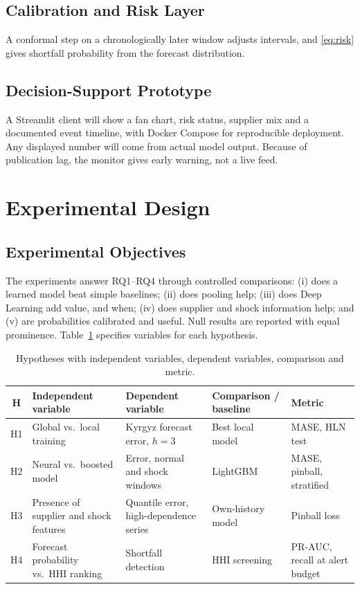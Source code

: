 \documentclass[conference]{IEEEtran}
\begin{document}
\subsection{Calibration and Risk Layer}
A conformal step on a chronologically later window adjusts intervals, and \eqref{eq:risk} gives shortfall probability from the forecast distribution.

\subsection{Decision-Support Prototype}
A Streamlit client will show a fan chart, risk status, supplier mix and a documented event timeline, with Docker Compose for reproducible deployment. Any displayed number will come from actual model output. Because of publication lag, the monitor gives early warning, not a live feed.

\section{Experimental Design}\label{sec:exp}

\subsection{Experimental Objectives}
The experiments answer RQ1--RQ4 through controlled comparisons: (i) does a learned model beat simple baselines; (ii) does pooling help; (iii) does Deep Learning add value, and when; (iv) does supplier and shock information help; and (v) are probabilities calibrated and useful. Null results are reported with equal prominence. Table~\ref{tab:hyp} specifies variables for each hypothesis.

\begin{table}[t]
\centering
\caption{Hypotheses with independent variables, dependent variables, comparison and metric.}
\label{tab:hyp}
\small
\begin{tabularx}{\textwidth}{@{}c X X X X@{}}
\toprule
H & Independent variable & Dependent variable & Comparison / baseline & Metric\\
\midrule
H1 & Global vs.\ local training & Kyrgyz forecast error, $h=3$ & Best local model & MASE, HLN test\\
H2 & Neural vs.\ boosted model & Error, normal and shock windows & LightGBM & MASE, pinball, stratified\\
H3 & Presence of supplier and shock features & Quantile error, high-dependence series & Own-history model & Pinball loss\\
H4 & Forecast probability vs.\ HHI ranking & Shortfall detection & HHI screening & PR-AUC, recall at alert budget\\
\bottomrule
\end{tabularx}
\end{table}
\end{document}
